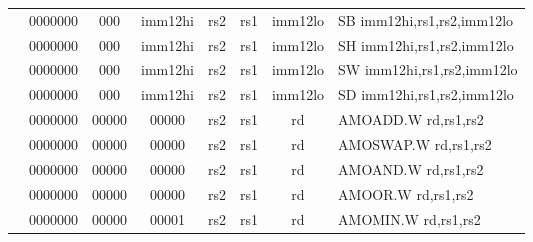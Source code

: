 \begin{table}[p]
\begin{small}
\begin{center}
\begin{tabular}{rcccccccccl}
&
\multicolumn{1}{|c|}{0000000} &
\multicolumn{2}{c|}{000} &
\multicolumn{3}{c|}{imm12hi} &
\multicolumn{1}{c|}{rs2} &
\multicolumn{1}{c|}{rs1} &
\multicolumn{1}{c|}{imm12lo} & SB imm12hi,rs1,rs2,imm12lo \\
\cline{2-10}
  

&
\multicolumn{1}{|c|}{0000000} &
\multicolumn{2}{c|}{000} &
\multicolumn{3}{c|}{imm12hi} &
\multicolumn{1}{c|}{rs2} &
\multicolumn{1}{c|}{rs1} &
\multicolumn{1}{c|}{imm12lo} & SH imm12hi,rs1,rs2,imm12lo \\
\cline{2-10}
  

&
\multicolumn{1}{|c|}{0000000} &
\multicolumn{2}{c|}{000} &
\multicolumn{3}{c|}{imm12hi} &
\multicolumn{1}{c|}{rs2} &
\multicolumn{1}{c|}{rs1} &
\multicolumn{1}{c|}{imm12lo} & SW imm12hi,rs1,rs2,imm12lo \\
\cline{2-10}
  

&
\multicolumn{1}{|c|}{0000000} &
\multicolumn{2}{c|}{000} &
\multicolumn{3}{c|}{imm12hi} &
\multicolumn{1}{c|}{rs2} &
\multicolumn{1}{c|}{rs1} &
\multicolumn{1}{c|}{imm12lo} & SD imm12hi,rs1,rs2,imm12lo \\
\cline{2-10}
  

&
\multicolumn{1}{|c|}{0000000} &
\multicolumn{3}{c|}{00000} &
\multicolumn{2}{c|}{00000} &
\multicolumn{1}{c|}{rs2} &
\multicolumn{1}{c|}{rs1} &
\multicolumn{1}{c|}{rd} & AMOADD.W rd,rs1,rs2 \\
\cline{2-10}
  

&
\multicolumn{1}{|c|}{0000000} &
\multicolumn{3}{c|}{00000} &
\multicolumn{2}{c|}{00000} &
\multicolumn{1}{c|}{rs2} &
\multicolumn{1}{c|}{rs1} &
\multicolumn{1}{c|}{rd} & AMOSWAP.W rd,rs1,rs2 \\
\cline{2-10}
  

&
\multicolumn{1}{|c|}{0000000} &
\multicolumn{3}{c|}{00000} &
\multicolumn{2}{c|}{00000} &
\multicolumn{1}{c|}{rs2} &
\multicolumn{1}{c|}{rs1} &
\multicolumn{1}{c|}{rd} & AMOAND.W rd,rs1,rs2 \\
\cline{2-10}
  

&
\multicolumn{1}{|c|}{0000000} &
\multicolumn{3}{c|}{00000} &
\multicolumn{2}{c|}{00000} &
\multicolumn{1}{c|}{rs2} &
\multicolumn{1}{c|}{rs1} &
\multicolumn{1}{c|}{rd} & AMOOR.W rd,rs1,rs2 \\
\cline{2-10}
  

&
\multicolumn{1}{|c|}{0000000} &
\multicolumn{3}{c|}{00000} &
\multicolumn{2}{c|}{00001} &
\multicolumn{1}{c|}{rs2} &
\multicolumn{1}{c|}{rs1} &
\multicolumn{1}{c|}{rd} & AMOMIN.W rd,rs1,rs2 \\
\cline{2-10}
  


\end{tabular}
\end{center}
\end{small}
\end{table}
